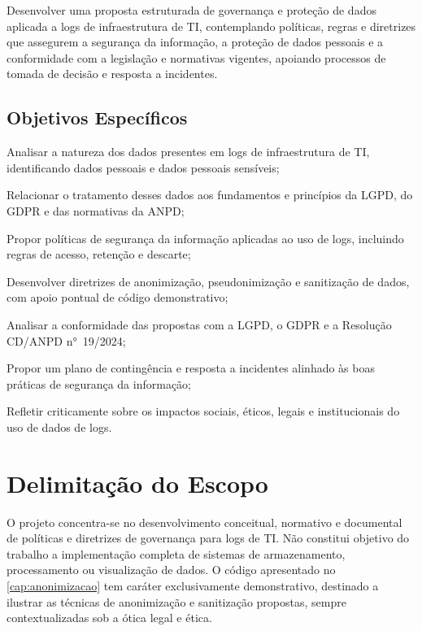 Desenvolver uma proposta estruturada de governança e proteção de dados aplicada a logs de infraestrutura de TI, contemplando políticas, regras e diretrizes que assegurem a segurança da informação, a proteção de dados pessoais e a conformidade com a legislação e normativas vigentes, apoiando processos de tomada de decisão e resposta a incidentes.

\subsection{Objetivos Específicos}
\label{subsec:objetivos-especificos}

\begin{alineas}
    \item Analisar a natureza dos dados presentes em logs de infraestrutura de TI, identificando dados pessoais e dados pessoais sensíveis;
    \item Relacionar o tratamento desses dados aos fundamentos e princípios da LGPD, do GDPR e das normativas da ANPD;
    \item Propor políticas de segurança da informação aplicadas ao uso de logs, incluindo regras de acesso, retenção e descarte;
    \item Desenvolver diretrizes de anonimização, pseudonimização e sanitização de dados, com apoio pontual de código demonstrativo;
    \item Analisar a conformidade das propostas com a LGPD, o GDPR e a Resolução CD/ANPD n°~19/2024;
    \item Propor um plano de contingência e resposta a incidentes alinhado às boas práticas de segurança da informação;
    \item Refletir criticamente sobre os impactos sociais, éticos, legais e institucionais do uso de dados de logs.
\end{alineas}

\section{Delimitação do Escopo}
\label{sec:escopo}

O projeto concentra-se no desenvolvimento conceitual, normativo e documental de políticas e diretrizes de governança para logs de TI. Não constitui objetivo do trabalho a implementação completa de sistemas de armazenamento, processamento ou visualização de dados. O código apresentado no \autoref{cap:anonimizacao} tem caráter exclusivamente demonstrativo, destinado a ilustrar as técnicas de anonimização e sanitização propostas, sempre contextualizadas sob a ótica legal e ética.

